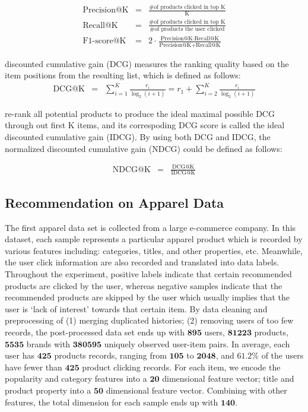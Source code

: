 \begin{eqnarray}
\text{Precision@K} & = & \frac{\text{\# of products clicked in top K}}{\text{K}} \nonumber \\
\text{Recall@K}      & = & \frac{\text{\# of products clicked in top K}}{\text{\# of products the user clicked}} \nonumber \\
\text{F1-score@K} & = & 2\cdot\frac{\text{Precision@K} \cdot \text{Recall@K}}{\text{Precision@K} + \text{Recall@K}}  \nonumber
\end{eqnarray}

discounted cumulative gain (DCG) measures the ranking quality based on the item positions from the resulting list, which is defined as follows:
\begin{eqnarray}
\text{DCG@K} & = & \sum_{i=1}^K\frac{r_i}{\log_2(i+1)} =  r_1 + \sum_{i=2}^K\frac{r_i}{\log_2(i+1)}\nonumber
\end{eqnarray}

re-rank all potential products to produce the ideal maximal possible DCG through out first K items, and its correspoding DCG score is called the ideal discounted cumulative gain (IDCG).  By using both DCG and IDCG, the normalized discounted cumulative gain (NDCG) could be defined as follows:

\begin{eqnarray}
\text{NDCG@K} & = & \frac{\text{DCG@K}}{\text{IDCG@K}}\nonumber
\end{eqnarray}

\subsection{Recommendation on Apparel Data}
The first apparel data set is collected from a large e-commerce company.  In this dataset, each sample represents a particular apparel product which is recorded by various features including: categories, titles, and other properties, etc.  Meanwhile, the user click information are also recorded and translated into data labels. Throughout the experiment, positive labels indicate that certain recommended products are clicked by the user, whereas negative samples indicate that the recommended products are skipped by the user which usually implies that the user is `lack of interest' towards that certain item.  By data cleaning and preprocessing of (1) merging duplicated histories; (2) removing users of too few records, the post-processed data set ends up with $\mathbf{895}$ users, $\mathbf{81223}$ products, $\mathbf{5535}$ brands with $\mathbf{380595}$ uniquely observed user-item pairs.  In average, each user has $\mathbf{425}$ products records, ranging from $\mathbf{105}$ to $\mathbf{2048}$, and $\mathbf{61.2\%}$ of the users have fewer than $\mathbf{425}$ product clicking records.  For each item, we encode the popularity and category features into a $\mathbf{20}$ dimensional feature vector; title and product property into a $\mathbf{50}$ dimensional feature vector.  Combining with other features, the total dimension for each sample ends up with $\mathbf{140}$.

